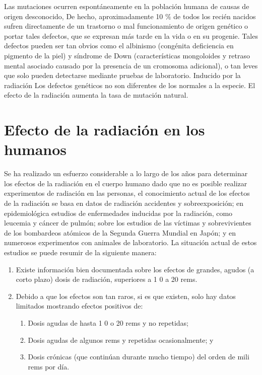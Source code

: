 \documentclass[]{article}
\begin{document}
Las mutaciones ocurren espontáneamente en la población humana de causas de origen desconocido, De hecho, aproximadamente 10 $\%$ de todos los recién nacidos sufren directamente de un trastorno o mal funcionamiento de origen genético o portar tales defectos, que se expresan más tarde en la vida o en su progenie. Tales defectos pueden ser tan obvios como el albinismo (congénita deficiencia en pigmento de la piel) y síndrome de Down (características mongoloides y retraso mental asociado causado por la presencia de un cromosoma adicional), o tan leves que solo pueden detectarse mediante pruebas de laboratorio. Inducido por la radiación Los defectos genéticos no son diferentes de los normales a la especie. El efecto de la radiación aumenta la tasa de mutación natural.\\

\section{Efecto de la radiación en los humanos}

Se ha realizado un esfuerzo considerable a lo largo de los años para determinar los efectos de la radiación en el cuerpo humano dado que no es posible realizar experimentos de radiación en las personas, el conocimiento actual de los efectos de la radiación se basa en datos de radiación accidentes y sobreexposición; en epidemiológica estudios de enfermedades inducidas por la radiación, como leucemia y cáncer de pulmón; sobre los estudios de las víctimas y sobrevivientes de los bombardeos atómicos de la Segunda Guerra Mundial en Japón; y en numerosos experimentos con animales de laboratorio. La situación actual de estos estudios se puede resumir de la siguiente manera:\\

\begin{enumerate}
	\item Existe información bien documentada sobre los efectos de grandes, agudos (a corto plazo)	dosis de radiación, superiores a 1 0 a 20 rems.
	\item Debido a que los efectos son tan raros, si es que existen, solo hay datos limitados
	mostrando efectos positivos de:	
	\begin{enumerate}
		\item Dosis agudas de hasta 1 0 o 20 rems y no repetidas;
		\item Dosis agudas de algunos rems y repetidas ocasionalmente; y
		\item Dosis crónicas (que continúan durante mucho tiempo) del orden de mili rems por día.
	\end{enumerate}	
\end{enumerate}
\end{document}
